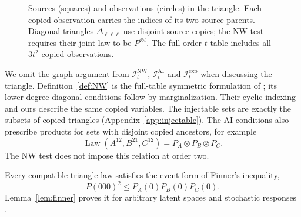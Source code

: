 \documentclass[11pt]{article}
\theoremstyle{plain}
\theoremstyle{definition}
\DeclareMathOperator{\Law}{Law}
\newcommand{\INW}{\mathcal I^{\mathrm{NW}}}
\newcommand{\IAI}{\mathcal I^{\mathrm{AI}}}
\newcommand{\Iexp}{\mathcal I^{\mathrm{exp}}}
\begin{document}
\begin{figure}[!htbp]
\centering
{}
\caption{Sources (squares) and observations (circles) in the triangle. Each copied observation carries the indices of its two source parents. Diagonal triangles $\Delta_{\ell\ell\ell}$ use disjoint source copies; the NW test requires their joint law to be $P^{\otimes t}$. The full order-$t$ table includes all $3t^2$ copied observations.}\label{fig:triangle}
\end{figure}


We omit the graph argument from $\INW_t$, $\IAI_t$ and $\Iexp_t$ when discussing the triangle. Definition~\ref{def:NW} is the full-table symmetric formulation of \cite[equations (16)--(19)]{NW2020}; its lower-degree diagonal conditions follow by marginalization. Their cyclic indexing and ours describe the same copied variables. The injectable sets are exactly the subsets of copied triangles (Appendix~\ref{app:injectable}). The AI conditions also prescribe products for sets with disjoint copied ancestors, for example
\[
\Law(A^{12},B^{21},C^{12})=P_A\otimes P_B\otimes P_C.
\]
The NW test does not impose this relation at order two.

Every compatible triangle law satisfies the event form of Finner's inequality,
\begin{equation}\label{eq:finner}
P(000)^2\le P_A(0)P_B(0)P_C(0).
\end{equation}
Lemma~\ref{lem:finner} proves it for arbitrary latent spaces and stochastic responses \cite{Finner1992,Renou2019}.
\end{document}
